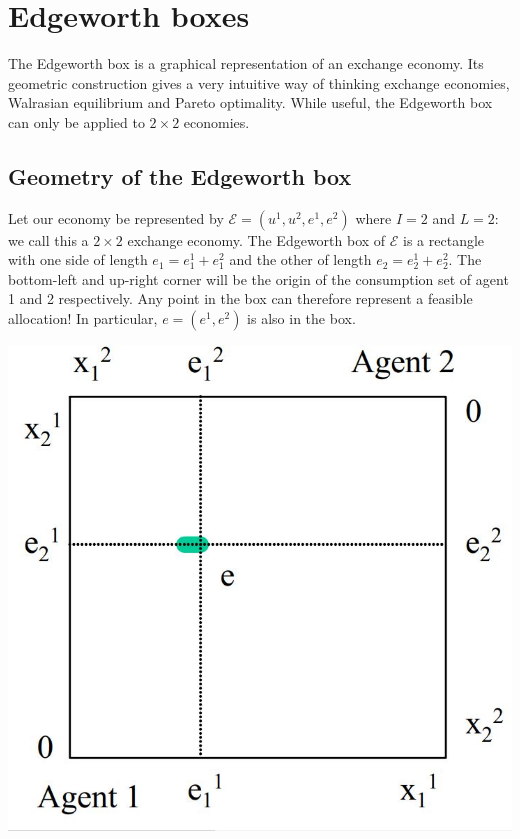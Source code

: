 \documentclass[12pt]{report}
\begin{document}
\section{Edgeworth boxes}

The Edgeworth box is a graphical representation of an exchange economy. Its geometric construction gives a very intuitive way of thinking exchange economies, Walrasian equilibrium and Pareto optimality. While useful, the Edgeworth box can only be applied to $2\times 2$ economies.

\subsection{Geometry of the Edgeworth box}

Let our economy be represented by $\mathcal{E} = (u^1, u^2, e^1, e^2) $ where $I = 2 $ and $L = 2$: we call this a $2\times 2$ exchange economy. The Edgeworth box of $\mathcal{E}$ is a rectangle with one side of length $e_1 = e_1^1 + e_1^2$ and the other of length $e_2 = e_2^1 + e_2^2$. The bottom-left and up-right corner will be the origin of the consumption set of agent 1 and 2 respectively. Any point in the box can therefore represent a feasible allocation! In particular, $e = (e^1, e^2)$ is also in the box. \begin{center}
\includegraphics[scale=0.35]{images/edge01}
\end{center}
\end{document}
